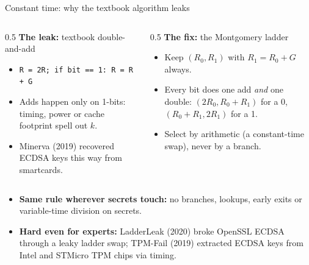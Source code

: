 \ifdefined\PRESENTATION\else\PassOptionsToClass{handout}{beamer}\fi\documentclass[aspectratio=169, lualatex]{beamer}
\begin{document}
\begin{frame}{Constant time: why the textbook algorithm leaks}
	\begin{columns}[t]
		\begin{column}{0.5\textwidth}
			\textbf{The leak:} textbook double-and-add
			\begin{itemize}
				\item \texttt{R = 2R; if bit == 1: R = R + G}
				\item Adds happen only on 1-bits: timing, power or cache footprint spell out $k$.
				\item Minerva (2019) recovered ECDSA keys this way from smartcards.
			\end{itemize}
		\end{column}
		\begin{column}{0.5\textwidth}
			\textbf{The fix:} the Montgomery ladder
			\begin{itemize}
				\item Keep $(R_0, R_1)$ with $R_1 = R_0 + G$ always.
				\item Every bit does one add \emph{and} one double: $(2R_0, R_0 + R_1)$ for a 0, $(R_0 + R_1, 2R_1)$ for a 1.
				\item Select by arithmetic (a constant-time swap), never by a branch.
			\end{itemize}
		\end{column}
	\end{columns}
	\vspace{-0.15cm}
	\begin{itemize}
		\item \textbf{Same rule wherever secrets touch:} no branches, lookups, early exits or variable-time division on secrets.
		\item \textbf{Hard even for experts:} LadderLeak (2020) broke OpenSSL ECDSA through a leaky ladder swap; TPM-Fail (2019) extracted ECDSA keys from Intel and STMicro TPM chips via timing.
	\end{itemize}
\end{frame}
\end{document}
